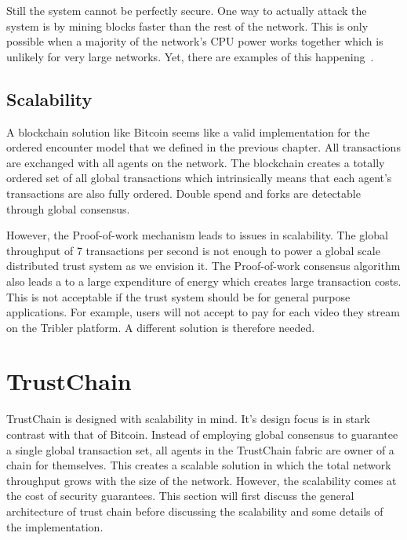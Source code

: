 Still the system cannot be perfectly secure. One way to actually attack the system is by mining 
blocks faster than the rest of the network. This is only possible when a majority of the network's 
CPU power works together which is unlikely for very large networks. Yet, there are examples of this 
happening~\cite{51percentbitcoingold, 51percentverge}.

\subsection{Scalability}
A blockchain solution like Bitcoin seems like a valid implementation for the ordered encounter model that we defined in the 
previous chapter. All transactions are exchanged with all agents on the network. The blockchain 
creates a totally ordered set of all global transactions which intrinsically means that each agent's 
transactions are also fully ordered. Double spend and forks are detectable through global consensus. 

However, the Proof-of-work mechanism leads to issues in scalability. The global throughput of 7 
transactions per second is not enough to power a global scale distributed trust system as we envision it. 
The Proof-of-work consensus algorithm also leads a to a large expenditure of energy which creates 
large transaction costs. This is not acceptable if the trust system should be for general purpose 
applications. For example, users will not accept to pay for each video they stream on the Tribler 
platform. A different solution is therefore needed.

\section{TrustChain}
\label{sec:trustchain}
TrustChain is designed with scalability in mind. It's design focus is in stark contrast with that of
Bitcoin. Instead of employing global consensus to guarantee a single global transaction set, 
all agents in the TrustChain fabric are owner of a chain for themselves. This creates a scalable 
solution in which the total network throughput grows with the size of the network. However, the
scalability comes at the cost of security guarantees. This section will first discuss the general 
architecture of trust chain before discussing the scalability and some details of the implementation.

